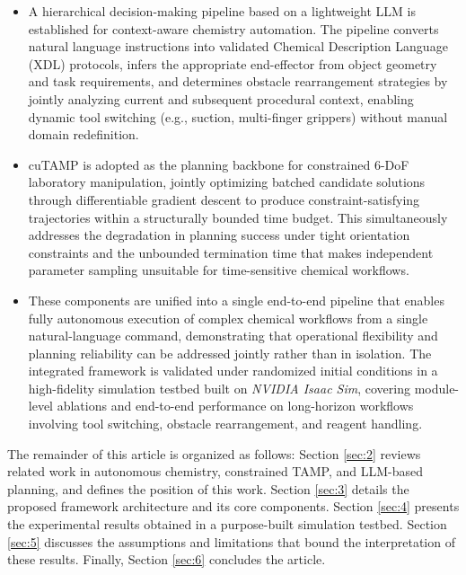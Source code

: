 \documentclass{ieeeaccess}
\begin{document}
\begin{itemize}

\item A hierarchical decision-making pipeline based on a lightweight LLM is established for context-aware chemistry automation. The pipeline converts natural language instructions into validated Chemical Description Language (XDL) protocols, infers the appropriate end-effector from object geometry and task requirements, and determines obstacle rearrangement strategies by jointly analyzing current and subsequent procedural context, enabling dynamic tool switching (e.g., suction, multi-finger grippers) without manual domain redefinition.

\item cuTAMP is adopted as the planning backbone for constrained 6-DoF laboratory manipulation, jointly optimizing batched candidate solutions through differentiable gradient descent to produce constraint-satisfying trajectories within a structurally bounded time budget. This simultaneously addresses the degradation in planning success under tight orientation constraints and the unbounded termination time that makes independent parameter sampling unsuitable for time-sensitive chemical workflows.

\item These components are unified into a single end-to-end pipeline that enables fully autonomous execution of complex chemical workflows from a single natural-language command, demonstrating that operational flexibility and planning reliability can be addressed jointly rather than in isolation. The integrated framework is validated under randomized initial conditions in a high-fidelity simulation testbed built on \textit{NVIDIA Isaac Sim}, covering module-level ablations and end-to-end performance on long-horizon workflows involving tool switching, obstacle rearrangement, and reagent handling.

\end{itemize}

The remainder of this article is organized as follows: Section \ref{sec:2} reviews related work in autonomous chemistry, constrained TAMP, and LLM-based planning, and defines the position of this work.
 Section \ref{sec:3} details the proposed framework architecture and its core components. Section \ref{sec:4} presents the experimental results obtained in a purpose-built simulation testbed. Section \ref{sec:5} discusses the assumptions and limitations that bound the interpretation of these results. Finally, Section \ref{sec:6} concludes the article.
\end{document}
